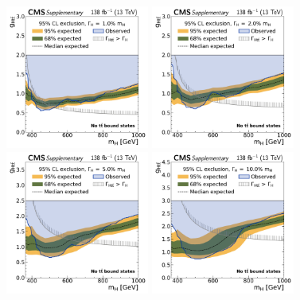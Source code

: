 \begin{figure}[!ph]
    \centering
    \includegraphics[width=0.42\textwidth]{figures/ah/lim1D/smtt/ll/H_limit_w1p0_g-scan.pdf}%
    \hspace*{0.05\textwidth}%
    \includegraphics[width=0.42\textwidth]{figures/ah/lim1D/smtt/ll/H_limit_w2p0_g-scan.pdf} \\
    \includegraphics[width=0.42\textwidth]{figures/ah/lim1D/smtt/ll/H_limit_w5p0_g-scan.pdf}%
    \hspace*{0.05\textwidth}%
    \includegraphics[width=0.42\textwidth]{figures/ah/lim1D/smtt/ll/H_limit_w10p0_g-scan.pdf}

\end{figure}
